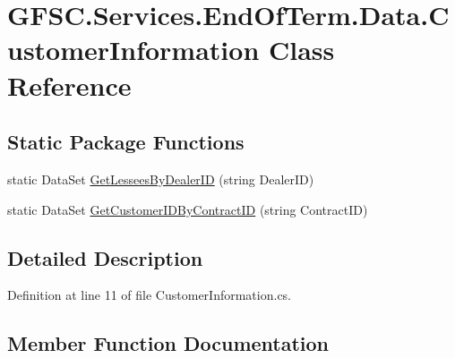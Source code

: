 \hypertarget{class_g_f_s_c_1_1_services_1_1_end_of_term_1_1_data_1_1_customer_information}{}\section{G\+F\+S\+C.\+Services.\+End\+Of\+Term.\+Data.\+Customer\+Information Class Reference}
\label{class_g_f_s_c_1_1_services_1_1_end_of_term_1_1_data_1_1_customer_information}
\subsection*{Static Package Functions}
\begin{DoxyCompactItemize}
\item 
static Data\+Set \mbox{\hyperlink{class_g_f_s_c_1_1_services_1_1_end_of_term_1_1_data_1_1_customer_information_a6f3f3f8ad5caeebf7818f4985dbf47db}{Get\+Lessees\+By\+Dealer\+ID}} (string Dealer\+ID)
\item 
static Data\+Set \mbox{\hyperlink{class_g_f_s_c_1_1_services_1_1_end_of_term_1_1_data_1_1_customer_information_a8d71f5018d14f44c6707100b3d7f7dbc}{Get\+Customer\+I\+D\+By\+Contract\+ID}} (string Contract\+ID)
\end{DoxyCompactItemize}


\subsection{Detailed Description}


Definition at line 11 of file Customer\+Information.\+cs.



\subsection{Member Function Documentation}
\mbox{\label{class_g_f_s_c_1_1_services_1_1_end_of_term_1_1_data_1_1_customer_information_a8d71f5018d14f44c6707100b3d7f7dbc}} 
